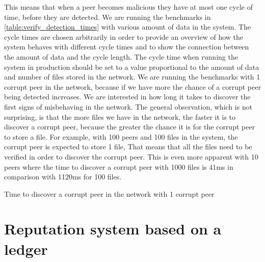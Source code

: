 This means that when a peer becomes malicious they have at most one cycle of time,
before they are detected.
We are running the benchmarks in \autoref{table:verify_detection_times} with various amount of data in the system.
The cycle times are chosen arbitrarily in order to provide an overview of how the system behaves with
different cycle times and to show the connection between the amount of data and the cycle length.
The cycle time when running the system in production should be set to a value proportional to
the amount of data and number of files stored in the network.
We are running the benchmarks with 1 corrupt peer in the network,
because if we have more the chance of a corrupt peer being detected increases.
We are interested in how long it takes to discover the first signs of misbehaving in the network.
The general observation, which is not surprising, is that the more files we have in the network,
the faster it is to discover a corrupt peer,
because the greater the chance it is for the corrupt peer to store a file.
For example, with 100 peers and 100 files in the system, the corrupt peer is expected to store 1 file,
That means that all the files need to be verified in order to discover the corrupt peer.
This is even more apparent with 10 peers where the time to discover a corrupt peer with 1000 files is
41ms in comparison with 1120ms for 100 files.

\begin{table}
  \myfloatalign
  \caption{Time to discover a corrupt peer in the network with 1 corrupt peer}
  \label{table:verify_detection_times}
\end{table}

\section{Reputation system based on a ledger}


